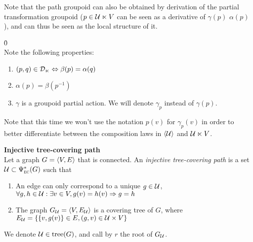 \begin{remark}Note that the path groupoid can also be obtained by derivation of the partial transformation groupoid (\ie $p \in \mathcal{U} \ltimes V$ can be seen as a derivative of $\gamma(p)$ \wrt $\alpha(p)$), and can thus be seen as the local structure of it.
\end{remark}

\begin{lemma}\h{0}\\
Note the following properties:
\begin{enumerate}
  \item $(p,q) \in \mathcal{D}_{\ltimes} \Leftrightarrow \beta(p) = \alpha(q)$
  \item $\alpha(p) = \beta(p^{-1})$
  \item $\gamma$ is a groupoid partial action. We will denote $\gamma_p$ instead of $\gamma(p)$.
\end{enumerate}
\end{lemma}

\begin{remark}
Note that this time we won't use the notation $p(v)$ for $\gamma_p(v)$ in order to better differentiate between the composition laws in $\langle \mathcal{U} \rangle$ and $\mathcal{U} \ltimes V$.
\end{remark}

\begin{definition}\textbf{Injective tree-covering path}\\
Let a graph $G = \langle V, E \rangle$ that is connected. An \emph{injective tree-covering path} is a set $\mathcal{U} \subset \Psi_{\operatorname{\textsc{ec}}}^*(G)$ such that
\begin{enumerate}
  \item An edge can only correspond to a unique $g\in \mathcal{U}$,\\
    \ie $\forall g,h \in \mathcal{U} : \exists v \in V, g(v) = h(v) \Rightarrow g=h$
  \item The graph $G_{\mathcal{U}} = \langle V, E_{\mathcal{U}} \rangle$ is a covering tree of $G$, where\\
    $E_{\mathcal{U}} = \{\{v, g(v)\} \in E, (g, v) \in \mathcal{U} \times V\}$
\end{enumerate}
We denote $\mathcal{U} \in \operatorname{tree}(G)$, and call by $r$ the root of $G_{\mathcal{U}}$.
\end{definition}

